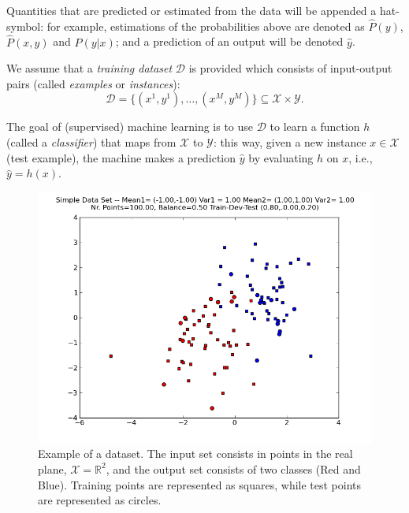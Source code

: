 Quantities that are predicted or estimated from the data will be appended a hat-symbol: for example, estimations of the probabilities above are denoted 
as ${\hat P}(y)$, ${\hat P}(x,y)$ and ${\hat P}(y|x)$; and a prediction of an output will be denoted ${\hat y}$. 

We assume that a \emph{training dataset} $\mathcal{D}$ is provided
which consists of input-output pairs (called \emph{examples} or
\emph{instances}): 
\begin{equation}
\mathcal{D} = \{(x^{1},y^{1}),\ldots,(x^{M},y^{M})\} \subseteq \mathcal{X} \times \mathcal{Y}.  
\end{equation}

The goal of (supervised) machine learning is to use $\mathcal{D}$ to learn a function $h$ (called a \emph{classifier}) 
that maps from $\mathcal{X}$ to $\mathcal{Y}$: this way, given a new instance 
$x \in \mathcal{X}$ (test example), the machine makes a prediction ${\hat y}$ by evaluating $h$ on $x$, i.e., ${\hat y} = h(x)$. 

\begin{figure}
\begin{center}
    \includegraphics[width=1\columnwidth]{figs/classification/simple_data_set}
  \caption{\label{simpleDataSet} Example of a dataset.
    The input set consists in points in the real plane, $\mathcal{X} =
    \mathbb{R}^2$, and the output set consists of two classes (Red
    and Blue). Training points are represented as squares, while test
    points are represented as circles.}
  \end{center}
\end{figure}


